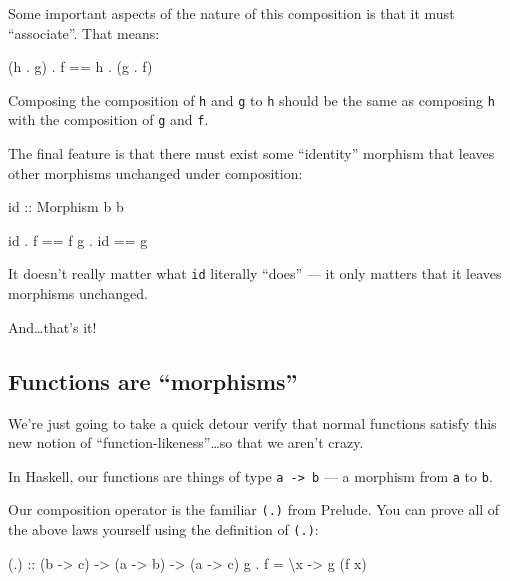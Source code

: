 \documentclass[]{article}
\newenvironment{Shaded}{}{}
\newcommand{\DataTypeTok}[1]{\textcolor[rgb]{0.56,0.13,0.00}{#1}}
\newcommand{\FunctionTok}[1]{\textcolor[rgb]{0.02,0.16,0.49}{#1}}
\newcommand{\NormalTok}[1]{#1}
\newcommand{\OperatorTok}[1]{\textcolor[rgb]{0.40,0.40,0.40}{#1}}
\newcommand{\OtherTok}[1]{\textcolor[rgb]{0.00,0.44,0.13}{#1}}
\begin{document}
Some important aspects of the nature of this composition is that it must
``associate''. That means:

\begin{Shaded}
\begin{Highlighting}[]
\NormalTok{(h }\OperatorTok{.}\NormalTok{ g) }\OperatorTok{.}\NormalTok{ f }\OperatorTok{==}\NormalTok{ h }\OperatorTok{.}\NormalTok{ (g }\OperatorTok{.}\NormalTok{ f)}
\end{Highlighting}
\end{Shaded}

Composing the composition of \texttt{h} and \texttt{g} to \texttt{h} should be
the same as composing \texttt{h} with the composition of \texttt{g} and
\texttt{f}.

The final feature is that there must exist some ``identity'' morphism that
leaves other morphisms unchanged under composition:

\begin{Shaded}
\begin{Highlighting}[]
\FunctionTok{id}\OtherTok{ ::} \DataTypeTok{Morphism}\NormalTok{ b b}

\FunctionTok{id} \OperatorTok{.}\NormalTok{ f  }\OperatorTok{==}\NormalTok{ f}
\NormalTok{g  }\OperatorTok{.} \FunctionTok{id} \OperatorTok{==}\NormalTok{ g}
\end{Highlighting}
\end{Shaded}

It doesn't really matter what \texttt{id} literally ``does'' --- it only matters
that it leaves morphisms unchanged.

And\ldots that's it!

\subsection{Functions are ``morphisms''}\label{functions-are-morphisms}

We're just going to take a quick detour verify that normal functions satisfy
this new notion of ``function-likeness''\ldots so that we aren't crazy.

In Haskell, our functions are things of type \texttt{a\ -\textgreater{}\ b} ---
a morphism from \texttt{a} to \texttt{b}.

Our composition operator is the familiar \texttt{(.)} from Prelude. You can
prove all of the above laws yourself using the definition of \texttt{(.)}:

\begin{Shaded}
\begin{Highlighting}[]
\OtherTok{(.) ::}\NormalTok{ (b }\OtherTok{{-}\textgreater{}}\NormalTok{ c) }\OtherTok{{-}\textgreater{}}\NormalTok{ (a }\OtherTok{{-}\textgreater{}}\NormalTok{ b) }\OtherTok{{-}\textgreater{}}\NormalTok{ (a }\OtherTok{{-}\textgreater{}}\NormalTok{ c)}
\NormalTok{g }\OperatorTok{.}\NormalTok{ f }\OtherTok{=}\NormalTok{ \textbackslash{}x }\OtherTok{{-}\textgreater{}}\NormalTok{ g (f x)}
\end{Highlighting}
\end{Shaded}
\end{document}
